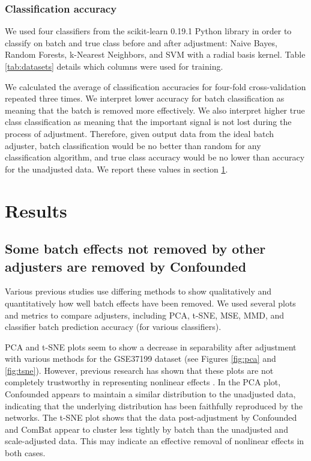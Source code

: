 \documentclass[notitlepage]{article}
\begin{document}
\subsubsection{Classification accuracy}

We used four classifiers from the scikit-learn 0.19.1 Python library \cite{pedregosa_scikit-learn_2011} in order to classify on batch and true class before and after adjustment: Naive Bayes, Random Forests, k-Nearest Neighbors, and SVM with a radial basis kernel.
Table \ref{tab:datasets} details which columns were used for training.

We calculated the average of classification accuracies for four-fold cross-validation repeated three times.
We interpret lower accuracy for batch classification as meaning that the batch is removed more effectively.
We also interpret higher true class classification as meaning that the important signal is not lost during the process of adjustment.
Therefore, given output data from the ideal batch adjuster, batch classification would be no better than random for any classification algorithm, and true class accuracy would be no lower than accuracy for the unadjusted data.
We report these values in section \ref{sec:results}.

\section{Results} \label{sec:results}

\subsection{Some batch effects not removed by other adjusters are removed by Confounded}

Various previous studies use differing methods to show qualitatively and quantitatively how well batch effects have been removed.
We used several plots and metrics to compare adjusters, including PCA, t-SNE, MSE, MMD, and classifier batch prediction accuracy (for various classifiers).

PCA and t-SNE plots seem to show a decrease in separability after adjustment with various methods for the GSE37199 dataset (see Figures \ref{fig:pca} and \ref{fig:tsne}).
However, previous research has shown that these plots are not completely trustworthy in representing nonlinear effects \cite{dayton_classifying_2017-1}.
In the PCA plot, Confounded appears to maintain a similar distribution to the unadjusted data, indicating that the underlying distribution has been faithfully reproduced by the networks.
The t-SNE plot shows that the data post-adjustment by Confounded and ComBat appear to cluster less tightly by batch than the unadjusted and scale-adjusted data.
This may indicate an effective removal of nonlinear effects in both cases.
\end{document}
